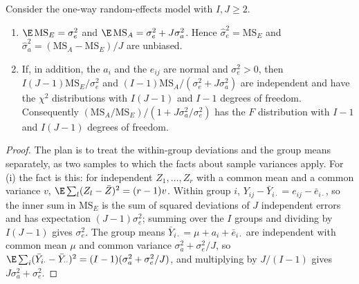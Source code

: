 \begin{refsection}
\begin{theorem}\label{thm:toolkit:anova}
Consider the one-way random-effects model with $I,J\ge2$.
\begin{enumerate}
\item $\E\,\mathrm{MS}_E=\sigma_e^2$ and $\E\,\mathrm{MS}_A=\sigma_e^2+J\sigma_a^2$. Hence $\hat\sigma_e^2=\mathrm{MS}_E$ and $\hat\sigma_a^2=(\mathrm{MS}_A-\mathrm{MS}_E)/J$ are unbiased.
\item If, in addition, the $a_i$ and the $e_{ij}$ are normal and $\sigma_e^2>0$, then $I(J-1)\mathrm{MS}_E/\sigma_e^2$ and $(I-1)\mathrm{MS}_A/(\sigma_e^2+J\sigma_a^2)$ are independent and have the $\chi^2$ distributions with $I(J-1)$ and $I-1$ degrees of freedom. Consequently $(\mathrm{MS}_A/\mathrm{MS}_E)/(1+J\sigma_a^2/\sigma_e^2)$ has the $F$ distribution with $I-1$ and $I(J-1)$ degrees of freedom.
\end{enumerate}
\end{theorem}

\begin{proof}
The plan is to treat the within-group deviations and the group means separately, as two samples to which the facts about sample variances apply. For (i) the fact is this: for independent $Z_1,\dots,Z_r$ with a common mean and a common variance $v$, $\E\sum_l(Z_l-\bar Z)^2=(r-1)v$. Within group $i$, $Y_{ij}-\bar Y_{i\cdot}=e_{ij}-\bar e_{i\cdot}$, so the inner sum in $\mathrm{MS}_E$ is the sum of squared deviations of $J$ independent errors and has expectation $(J-1)\sigma_e^2$; summing over the $I$ groups and dividing by $I(J-1)$ gives $\sigma_e^2$. The group means $\bar Y_{i\cdot}=\mu+a_i+\bar e_{i\cdot}$ are independent with common mean $\mu$ and common variance $\sigma_a^2+\sigma_e^2/J$, so $\E\sum_i(\bar Y_{i\cdot}-\bar Y_{\cdot\cdot})^2=(I-1)(\sigma_a^2+\sigma_e^2/J)$, and multiplying by $J/(I-1)$ gives $J\sigma_a^2+\sigma_e^2$.


\end{proof}
\end{refsection}
